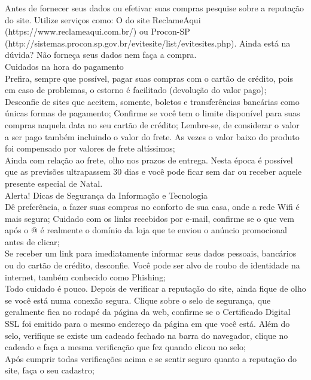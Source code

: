 \documentclass[]{article}
\begin{document}
Antes de fornecer seus dados ou efetivar suas compras pesquise sobre a reputação do site. Utilize serviços como: O do site ReclameAqui (https://www.reclameaqui.com.br/) ou Procon-SP (http://sistemas.procon.sp.gov.br/evitesite/list/evitesites.php). Ainda está na dúvida? Não forneça seus dados nem faça a compra.\\
\newline
Cuidados na hora do pagamento\\
\newline
Prefira, sempre que possível, pagar suas compras com o cartão de crédito, pois em caso de problemas, o estorno é facilitado (devolução do valor pago);\\
Desconfie de sites que aceitem, somente, boletos e transferências bancárias como únicas formas de pagamento;
Confirme se você tem o limite disponível para suas compras naquela data no seu cartão de crédito;
Lembre-se, de considerar o valor a ser pago também incluindo o valor do frete. As vezes o valor baixo do produto foi compensado por valores de frete altíssimos;\\
Ainda com relação ao frete, olho nos prazos de entrega. Nesta época é possível que as previsões ultrapassem 30 dias e você pode ficar sem dar ou receber aquele presente especial de Natal.\\
\newline
Alerta! Dicas de Segurança da Informação e Tecnologia\\
\newline
Dê preferência, a fazer suas compras no conforto de sua casa, onde a rede Wifi é mais segura;
Cuidado com os links recebidos por e-mail, confirme se o que vem após o @ é realmente o domínio da loja que te enviou o anúncio promocional antes de clicar;\\
Se receber um link para imediatamente informar seus dados pessoais, bancários ou do cartão de crédito, desconfie. Você pode ser alvo de roubo de identidade na internet, também conhecido como Phishing;\\
Todo cuidado é pouco. Depois de verificar a reputação do site, ainda fique de olho se você está numa conexão segura. Clique sobre o selo de segurança, que geralmente fica no rodapé da página da web, confirme se o Certificado Digital SSL foi emitido para o mesmo endereço da página em que você está. Além do selo, verifique se existe um cadeado fechado na barra do navegador, clique no cadeado e faça a mesma verificação que fez quando clicou no selo;\\
Após cumprir todas verificações acima e se sentir seguro quanto a reputação do site, faça o seu cadastro;
\end{document}
